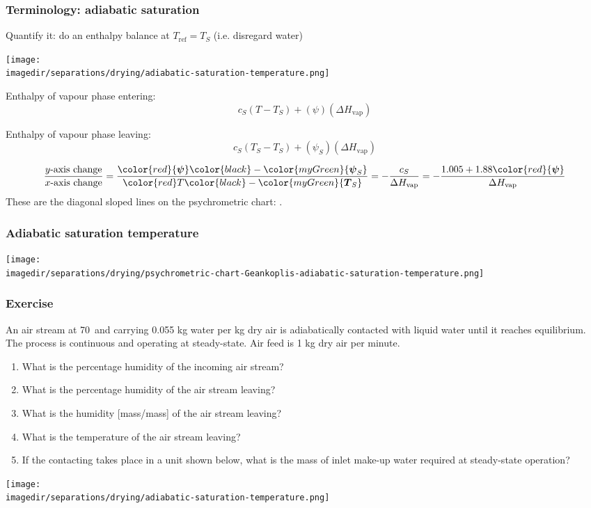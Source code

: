 \begin{frame}\frametitle{Terminology: adiabatic saturation}
	Quantify it: do an enthalpy balance at $T_\text{ref} = T_S$ {\scriptsize (i.e. disregard water)}
	\begin{center}
		\texttt{[image: \\imagedir/separations/drying/adiabatic-saturation-temperature.png]}
	\end{center}
	\vspace{-6pt}
	\begin{exampleblock}{Enthalpy of vapour phase entering:}
		\[c_S\left(T - T_S \right) + (\psi) (\Delta H_\text{vap})\]
	\end{exampleblock}
	\begin{exampleblock}{Enthalpy of vapour phase leaving:}
		\[c_S\left(T_S - T_S \right) + (\psi_S) (\Delta H_\text{vap})\]
	\end{exampleblock}
	
	\[	
		\displaystyle \frac{y\text{-axis change}}{x\text{-axis change}} = \frac{\color{red}{\boldsymbol \psi} \color{black} - \color{myGreen}{\boldsymbol \psi_S}}{\color{red}T \color{black}- \color{myGreen}{\boldsymbol T_S}} = - \frac{c_S}{\Delta H_\text{vap}} = - \frac{1.005 + 1.88 \color{red}{\boldsymbol \psi}}{\Delta H_\text{vap}}
	\]
	These are the diagonal sloped lines on the psychrometric chart: {\color{purple}{adiabatic saturation curves}}.
\end{frame}

\begin{frame}\frametitle{Adiabatic saturation temperature}
	\vfill
	\begin{center}
		\texttt{[image: \\imagedir/separations/drying/psychrometric-chart-Geankoplis-adiabatic-saturation-temperature.png]}
	\end{center}
\end{frame}

\begin{frame}\frametitle{Exercise}
	An air stream at 70\degC$\,$ and carrying 0.055 kg water per kg dry air is adiabatically contacted with liquid water until it reaches equilibrium. The process is continuous and operating at steady-state. Air feed is 1 kg dry air per minute.
	\begin{enumerate}
		\item	What is the percentage humidity of the incoming air stream?
		\item	What is the percentage humidity of the air stream leaving?
		\item	What is the humidity [mass/mass] of the air stream leaving?
		\item	What is the temperature of the air stream leaving?
		\item	If the contacting takes place in a unit shown below, what is the mass of inlet make-up water required at steady-state operation?
	\end{enumerate}
	\begin{center}
		\texttt{[image: \\imagedir/separations/drying/adiabatic-saturation-temperature.png]}
	\end{center}
\end{frame}

